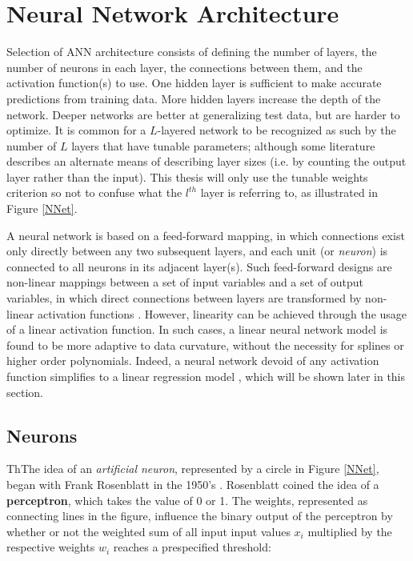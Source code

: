 
\section{Neural Network Architecture} %

Selection of ANN architecture consists of defining the number of layers, the number of neurons in each layer, the connections between them, and the activation function(s) to use. One hidden layer is sufficient to make accurate predictions from training data. More hidden layers increase the depth of the network. Deeper networks are better at generalizing test data, but are harder to optimize. \cite{Goodfellow-et-al-2016} 
It is common for a $L$-layered network to be recognized as such by the number of $L$ layers that have tunable parameters; although some literature describes an alternate means of describing layer sizes \cite{bishop1995} (i.e. by counting the output layer rather than the input).  This thesis will only use the tunable weights criterion so not to confuse what the $l^{th}$ layer is referring to, as illustrated in Figure \ref{NNet}.  

A neural network is based on a feed-forward mapping, in which connections exist only directly between any two subsequent layers, and each unit (or \textit{neuron}) is connected to all neurons in its adjacent layer(s).  Such feed-forward designs are non-linear mappings between a set of input variables and a set of output variables, in which direct connections between layers are transformed by non-linear activation functions \cite{bishop2006pattern}.
However, linearity can be achieved through the usage of a linear activation function.  In such cases, a linear neural network model is found to be more adaptive to data curvature, without the necessity for splines or higher order polynomials. Indeed, a neural network devoid of any activation function simplifies to a linear regression model \cite{sharma2017activation}, which will be shown later in this section.

\hypertarget{foundations}{%
\subsection{Neurons}\label{foundations}}

ThThe idea of an \textit{artificial neuron}, represented by a circle in Figure \ref{NNet}, began with Frank Rosenblatt in the 1950's \cite{nielsen}.  Rosenblatt coined the idea of a \textbf{perceptron}, which takes the value of 0 or 1.  The weights, represented as connecting lines in the figure, influence the binary output of the perceptron by whether or not the weighted sum of all input input values $x_i$ multiplied by the respective weights $w_i$ reaches a prespecified threshold:

